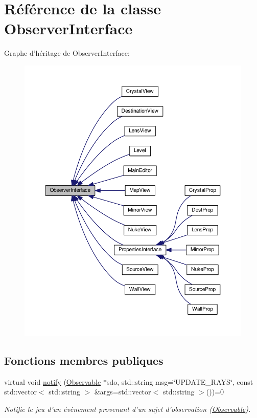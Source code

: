 \hypertarget{classObserverInterface}{\section{Référence de la classe Observer\+Interface}
\label{classObserverInterface}
}


Graphe d'héritage de Observer\+Interface\+:\nopagebreak
\begin{figure}[H]
\begin{center}
\leavevmode
\includegraphics[width=350pt]{d7/d5b/classObserverInterface__inherit__graph}
\end{center}
\end{figure}
\subsection*{Fonctions membres publiques}
\begin{DoxyCompactItemize}
\item 
virtual void \hyperlink{classObserverInterface_a1bbd22519c2942d978804714db12c8b2}{notify} (\hyperlink{classObservable}{Observable} $\ast$sdo, std\+::string msg=\char`\"{}U\+P\+D\+A\+T\+E\+\_\+\+R\+A\+Y\+S\char`\"{}, const std\+::vector$<$ std\+::string $>$ \&args=std\+::vector$<$ std\+::string $>$())=0
\begin{DoxyCompactList}\small\item\em Notifie le jeu d'un évènement provenant d'un sujet d'observation (\hyperlink{classObservable}{Observable}). \end{DoxyCompactList}\end{DoxyCompactItemize}


